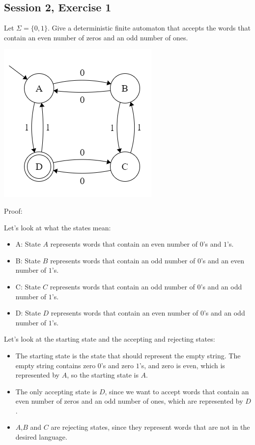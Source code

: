 \subsection{Session 2, Exercise 1}


Let $\Sigma=\{0,1\}$. Give a deterministic finite automaton that accepts the words that contain an even number of zeros and an odd number of ones.


\includegraphics[width=0.4\linewidth]{02/2_1.png}

Proof:

Let's look at what the states mean:

\begin{itemize}
    \item A: State $A$ represents words that contain an even number of $0$'s and $1$'s.
    \item B: State $B$ represents words that contain an odd number of $0$'s and an even number of $1$'s.
    \item C: State $C$ represents words that contain an odd number of $0$'s and an odd number of $1$'s.
    \item D: State $D$ represents words that contain an even number of $0$'s and an odd number of $1$'s.
\end{itemize}

Let's look at the starting state and the accepting and rejecting states:

\begin{itemize}
    \item The starting state is the state that should represent the empty string. The empty string contains zero $0$'s and zero $1$'s, and zero is even, which is represented by $A$, so the starting state is $A$.
    \item The only accepting state is $D$, since we want to accept words that contain an even number of zeros and an odd number of ones, which are represented by $D$.
    \item $A$,$B$ and $C$ are rejecting states, since they represent words that are not in the desired language.
\end{itemize}

